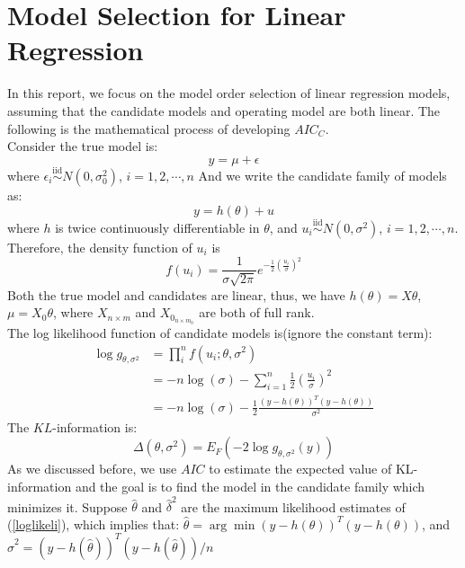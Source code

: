 
\section{Model Selection for Linear Regression}
In this report, we focus on the model order selection of linear regression models, assuming that the candidate models and operating model are both linear. The following is the mathematical process of developing $AIC_C$.\\ 

Consider the true model is:
\begin{equation}\label{true}
    y = \mu + \epsilon
\end{equation}
where $\epsilon_i  \overset{\mathrm{iid}}{\sim} N(0, \sigma_0^2)$, $i =1, 2,\cdots, n$
And we write the candidate family of models as:
\begin{equation}\label{candidate}
    y = h(\theta) + u
\end{equation}
where $h$ is twice continuously differentiable in $\theta$, and $u_i  \overset{\mathrm{iid}}{\sim} N(0, \sigma^2)$, $i =1, 2,\cdots, n$. Therefore, the density function of $u_i$ is $$f(u_i) = \frac{1}{\sigma\sqrt{2\pi}}e^{-\frac{1}{2}(\frac{u_i}{\sigma})^2}$$
Both the true model and candidates are linear, thus, we have $h(\theta)=X\theta $, $\mu= X_0\theta$, where $X_{n\times m}$ and $X_0_{n\times m_0}$ are both of full rank.\\
The log likelihood function of candidate models is(ignore the constant term): 
\begin{equation}\label{loglikeli}
    \begin{split}
        \log g_{\theta,\sigma^2} &= \prod_i^n f(u_i;\theta, \sigma^2)\\
        &= -n\log(\sigma)-\sum_{i=1}^n\frac{1}{2}(\frac{u_i}{\sigma})^2\\
        &=-n\log(\sigma)-\frac{1}{2}\frac{(y -h(\theta))^T(y -h(\theta))}{\sigma^2}
    \end{split}
\end{equation}
The $KL$-information is:
\begin{equation}\label{KL}
    \Delta (\theta, \sigma^2) = E_F(-2\log g_{\theta, \sigma^2}(y))
\end{equation}
As we discussed before, we use $AIC$ to estimate the expected value of KL-information and the goal is to find the model in the candidate family which minimizes it. Suppose $\hat\theta$ and $\hat\delta^2$ are the maximum likelihood estimates of (\ref{loglikeli}), which implies that:
$\hat\theta = \arg \min(y -h(\theta))^T(y -h(\theta))$, and $\hat\sigma^2 = (y -h(\hat\theta))^T(y -h(\hat\theta))/n$
